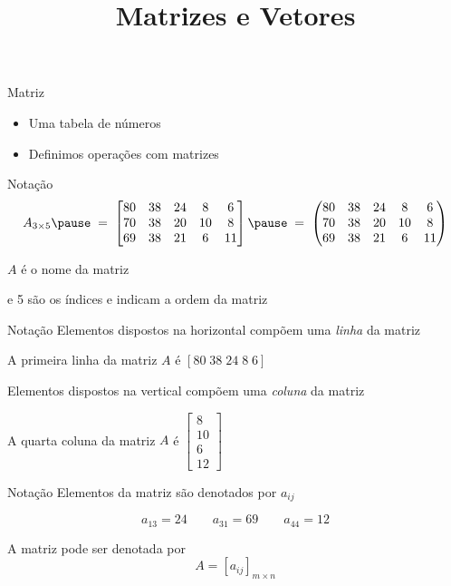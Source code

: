\documentclass[fleqn,aspectratio=169,12pt]{beamer}
\title{Matrizes e Vetores}
\begin{document}
\addtitle

\begin{frame}{Matriz}
  \begin{itemize}[<+->]
    \item Uma tabela de números
    \item Definimos operações com matrizes
  \end{itemize}
\end{frame}

\begin{frame}{Notação}
\[
  A_{3 \times 5}
  \pause
  \;=\;
  \begin{bmatrix}
    80 & 38 & 24 & 8  & 6  \\
    70 & 38 & 20 & 10 & 8  \\
    69 & 38 & 21 & 6  & 11
  \end{bmatrix}
  \pause
  \;=\;
  \begin{pmatrix}
    80 & 38 & 24 & 8  & 6  \\
    70 & 38 & 20 & 10 & 8  \\
    69 & 38 & 21 & 6  & 11
  \end{pmatrix}
\]

\pause
$A$ é o nome da matriz

 e 5 são os índices e indicam a ordem da matriz
\end{frame}

\begin{frame}{Notação}
Elementos dispostos na horizontal compõem uma \emph{linha} da matriz

\pause
A primeira linha da matriz $A$ é
\(
  [80 \; 38 \; 24 \; 8 \; 6]
\)

\pause
\bigskip
\bigskip
Elementos dispostos na vertical compõem uma \emph{coluna} da matriz

\pause
A quarta coluna da matriz $A$ é
\(
\begin{bmatrix}
  8  \\
  10 \\
  6  \\
  12
\end{bmatrix}
\)
\end{frame}

\begin{frame}{Notação}
  Elementos da matriz são denotados por $a_{ij}$

  \pause
  \[
    a_{13} = 24\qquad
    a_{31} = 69\qquad
    a_{44} = 12
  \]

  \pause
  \bigskip
  A matriz pode ser denotada por
  \[
     A = [a_{ij}]_{m \times n}
  \]
\end{frame}
\end{document}
